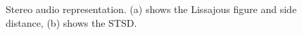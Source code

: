 \begin{figure}[t]
    \centering
    \caption{Stereo audio representation. (a) shows the Lissajous figure and side distance, (b) shows the STSD.}
    \label{fig:stsd}
\end{figure}